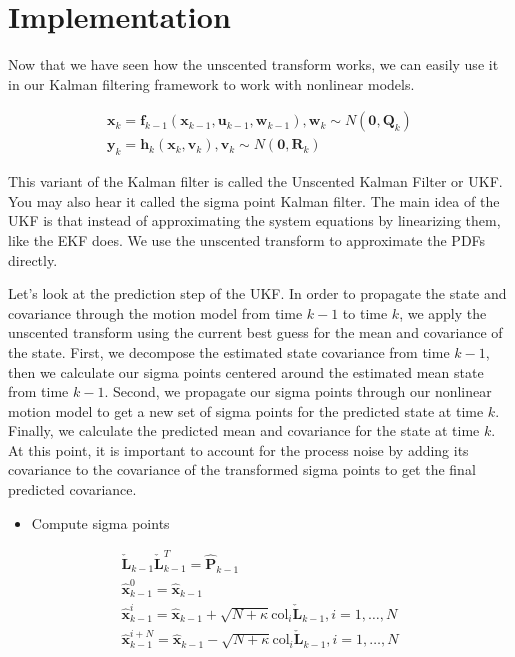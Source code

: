 \section{Implementation}

Now that we have seen how the unscented transform works, we can easily use it in our Kalman filtering framework
to work with nonlinear models. 

\begin{eqnarray}
\mathbf{x}_k  = \mathbf{f}_{k-1}(\mathbf{x}_{k-1}, \mathbf{u}_{k-1}, \mathbf{w}_{k-1}), \mathbf{w}_{k} \sim N(\mathbf{0}, \mathbf{Q}_k)  \\
\mathbf{y}_k  = \mathbf{h}_{k}(\mathbf{x}_{k}, \mathbf{v}_{k}),  \mathbf{v}_{k} \sim N(\mathbf{0}, \mathbf{R}_k)  
\end{eqnarray}

This variant of the Kalman filter is called the Unscented Kalman Filter or UKF. You may also hear it called
the sigma point Kalman filter. The main idea of the UKF is that instead
of approximating the system equations by linearizing them, like the EKF does. We use the unscented transform to
approximate the PDFs directly. 

Let's look at the prediction step of the UKF.  In order to propagate the state and covariance
through the motion model from time $k-1$ to time $k$, we apply the unscented transform
using the current best guess for the mean and covariance of the state. First, we decompose the estimated state
covariance from time $k-1$, then we calculate our sigma points centered around
the estimated mean state from time $k-1$. Second, we propagate our sigma points
through our nonlinear motion model to get a new set of sigma points for
the predicted state at time $k$. Finally, we calculate
the predicted mean and covariance for the state at time $k$. At this point,
it is important to account for the process noise by adding its covariance
to the covariance of the transformed sigma points to get the final
predicted covariance.

\begin{itemize}
\item Compute sigma points
\end{itemize}

\begin{eqnarray}
\check{\mathbf{L}}_{k-1}\check{\mathbf{L}}_{k-1}^T  = \hat{\mathbf{P}}_{k-1}  \\
\hat{\mathbf{x}}_{k-1}^{0}  = \hat{\mathbf{x}}_{k-1} \\
\hat{\mathbf{x}}_{k-1}^{i}  = \hat{\mathbf{x}}_{k-1} + \sqrt{N + \kappa} \text{col}_i \check{\mathbf{L}}_{k-1}, i = 1, \ldots, N \\
\hat{\mathbf{x}}_{k-1}^{i + N}  = \hat{\mathbf{x}}_{k-1} - \sqrt{N + \kappa} \text{col}_i \check{\mathbf{L}}_{k-1}, i = 1, \ldots, N 
\end{eqnarray}

